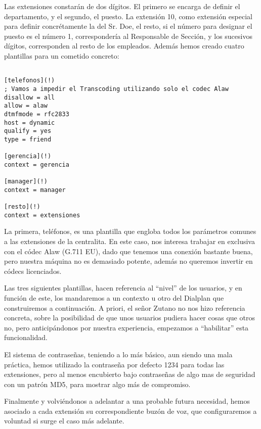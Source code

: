 
Las extensiones constarán de dos dígitos. El primero se encarga de definir el departamento, y el segundo, el puesto. La extensión 10, como extensión especial para definir concrétamente la del Sr. Doe, el resto, si el número para designar el puesto es el número 1, correspondería al Responsable de Sección, y los sucesivos dígitos, corresponden al resto de los empleados. Además hemos creado cuatro plantillas para un cometido concreto: 

\begin{lstlisting}[style=bash,title={/etc/asterisk/sip.conf}]

[telefonos](!)
; Vamos a impedir el Transcoding utilizando solo el codec Alaw
disallow = all
allow = alaw
dtmfmode = rfc2833
host = dynamic
qualify = yes
type = friend

[gerencia](!)
context = gerencia

[manager](!)
context = manager

[resto](!)
context = extensiones

\end{lstlisting}

La primera, teléfonos, es una plantilla que engloba todos los parámetros comunes a las extensiones de la centralita. En este caso, nos interesa trabajar en exclusiva con el códec Alaw (G.711 EU), dado que tenemos una conexión bastante buena, pero nuestra máquina no es demasiado potente, además no queremos invertir en códecs licenciados.

Las tres siguientes plantillas, hacen referencia al ``nivel'' de los usuarios, y en función de este, los mandaremos a un contexto u otro del Dialplan que construiremos a continuación. A priori, el señor Zutano no nos hizo referencia concreta, sobre la posibilidad de que unos usuarios pudiera hacer cosas que otros no, pero anticipándonos por nuestra experiencia, empezamos a ``habilitar'' esta funcionalidad.

El sistema de contraseñas, teniendo a lo más básico, aun siendo una mala práctica, hemos utilizado la contraseña por defecto 1234 para todas las extensiones, pero al menos encubierto bajo contraseñas de algo mas de seguridad con un patrón MD5, para mostrar algo más de compromiso.

Finalmente y volviéndonos a adelantar a una probable futura necesidad, hemos asociado a cada extensión su correspondiente buzón de voz, que configuraremos a voluntad si surge el caso más adelante.


